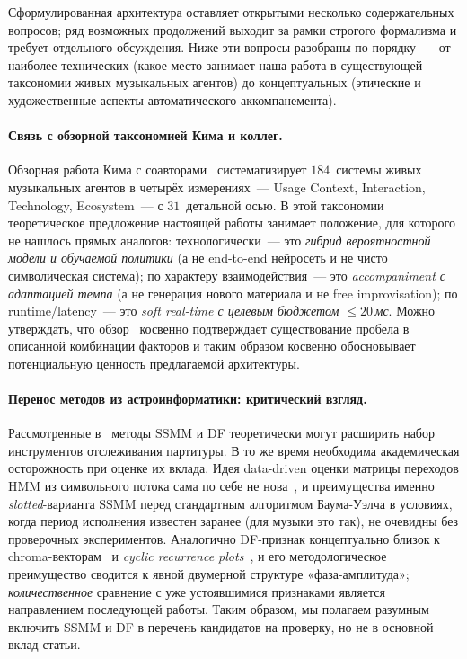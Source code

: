 %
Сформулированная архитектура оставляет открытыми несколько
содержательных вопросов; ряд возможных продолжений выходит за
рамки строгого формализма и требует отдельного обсуждения. Ниже
эти вопросы разобраны по порядку~--- от наиболее технических
(какое место занимает наша работа в существующей таксономии
живых музыкальных агентов) до концептуальных (этические и
художественные аспекты автоматического аккомпанемента).

\paragraph*{Связь с обзорной таксономией Кима и
коллег.} Обзорная работа Кима с
соавторами~\cite{Kim2026LiveAgents} систематизирует $184$~системы
живых музыкальных агентов в четырёх измерениях~--- Usage Context,
Interaction, Technology, Ecosystem~--- с $31$~детальной осью.
В этой таксономии теоретическое предложение настоящей
работы занимает положение, для которого не нашлось
прямых аналогов: технологически~--- это \textit{гибрид
вероятностной модели и обучаемой политики} (а не
end-to-end нейросеть и не чисто символическая система); по
характеру взаимодействия~--- это \textit{accompaniment с
адаптацией темпа} (а не генерация нового материала и не
free improvisation); по runtime/latency~--- это \textit{soft
real-time с целевым бюджетом $\le 20$\,мс}. Можно
утверждать, что обзор~\cite{Kim2026LiveAgents} косвенно
подтверждает существование пробела в описанной
комбинации факторов и таким образом косвенно
обосновывает потенциальную ценность предлагаемой
архитектуры.

\paragraph*{Перенос методов из астроинформатики: критический
взгляд.} Рассмотренные в~ методы SSMM и DF
теоретически могут расширить набор инструментов отслеживания
партитуры. В то же время необходима академическая осторожность
при оценке их вклада. Идея data-driven оценки матрицы переходов
HMM из символьного потока сама по себе не
нова~\cite[\S~III-C]{Rabiner1989}, и преимущества именно
\textit{slotted}-варианта SSMM перед стандартным алгоритмом
Баума-Уэлча в условиях, когда период исполнения известен
заранее (для музыки это так), не очевидны без проверочных
экспериментов. Аналогично DF-признак концептуально близок к
chroma-векторам~\cite{Mueller2007} и \textit{cyclic recurrence
plots}~\cite{MullerFMP2015}, и его методологическое преимущество
сводится к явной двумерной структуре «фаза-амплитуда»;
\textit{количественное} сравнение с уже устоявшимися признаками
является направлением последующей работы. Таким образом, мы
полагаем разумным включить SSMM и DF в перечень кандидатов на
проверку, но не в основной вклад статьи.

